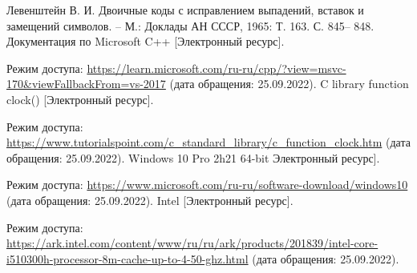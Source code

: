 \renewcommand\bibname{Список используемых источников} %

\begin{thebibliography}{5}
	Левенштейн В. И. Двоичные коды с исправлением выпадений, вставок и замещений символов. – М.: Доклады АН СССР, 1965: Т. 163. С. 845– 848.
	Документация по Microsoft C++ [Электронный ресурс]. 
	
	Режим доступа: \url{https://learn.microsoft.com/ru-ru/cpp/?view=msvc-170&viewFallbackFrom=vs-2017} (дата обращения: 25.09.2022).
	C library function clock() [Электронный ресурс]. 
	
	Режим доступа: \url{https://www.tutorialspoint.com/c_standard_library/c_function_clock.htm} (дата обращения: 25.09.2022).
	Windows 10 Pro 2h21 64-bit  Электронный ресурс]. 
	
	Режим доступа: \url{https://www.microsoft.com/ru-ru/software-download/windows10} (дата обращения: 25.09.2022).
	Intel [Электронный ресурс]. 
	
	Режим доступа: \url{https://ark.intel.com/content/www/ru/ru/ark/products/201839/intel-core-i510300h-processor-8m-cache-up-to-4-50-ghz.html} (дата обращения: 25.09.2022).
\end{thebibliography}